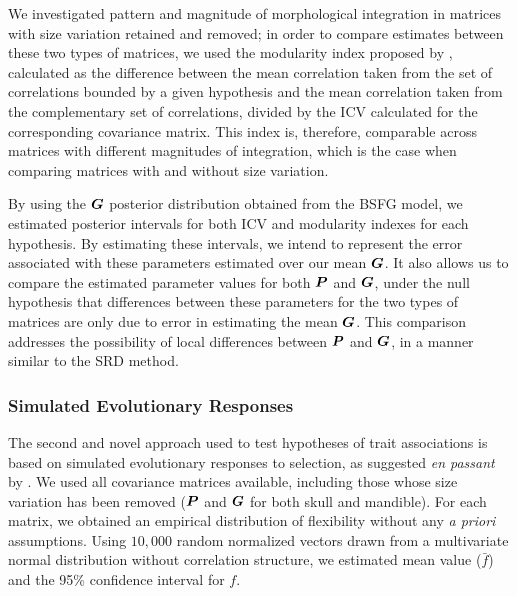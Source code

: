 \documentclass [twocolumn, natbib, nospthms, 10pt] {svjour3}
\begin{document}
We investigated pattern and magnitude of morphological integration in
matrices with size variation retained and removed; in order to compare
estimates between these two types of matrices, we used the modularity
index proposed by \citet {porto_size_2013}, calculated as the
difference between the mean correlation taken from the set of
correlations bounded by a given hypothesis and the mean correlation
taken from the complementary set of correlations, divided by the ICV
calculated for the corresponding covariance matrix. This index is,
therefore, comparable across matrices with different magnitudes of
integration, which is the case when comparing matrices with and
without size variation.

By using the $\boldsymbol{G}$ posterior distribution obtained from the BSFG
model, we estimated posterior intervals for both ICV and modularity
indexes for each hypothesis. By estimating these intervals, we intend
to represent the error associated with these parameters estimated over
our mean $\boldsymbol{G}$. It also allows us to compare the estimated
parameter values for both $\boldsymbol{P}$ and $\boldsymbol{G}$, under the null
hypothesis that differences between these parameters for the two types
of matrices are only due to error in estimating the mean
$\boldsymbol{G}$. This comparison addresses the possibility of local
differences between $\boldsymbol{P}$ and $\boldsymbol{G}$, in a manner similar to the
SRD method.

\subsubsection {Simulated Evolutionary Responses}
\label {mms:ser}

The second and novel approach used to test hypotheses of trait
associations is based on simulated evolutionary responses to
selection, as suggested \emph{en passant} by \citet
{hansen_measuring_2008}. We used all covariance matrices available,
including those whose size variation has been removed ($\boldsymbol{P}$ and
$\boldsymbol{G}$ for both skull and mandible). For each matrix, we obtained an
empirical distribution of flexibility \citep{marroig_evolution_2009}
without any \emph{a priori} assumptions. Using $10,000$ random
normalized vectors drawn from a multivariate normal distribution
without correlation structure, we estimated mean value ($\bar{f}$) and
the 95\% confidence interval for $f$.
\end{document}
